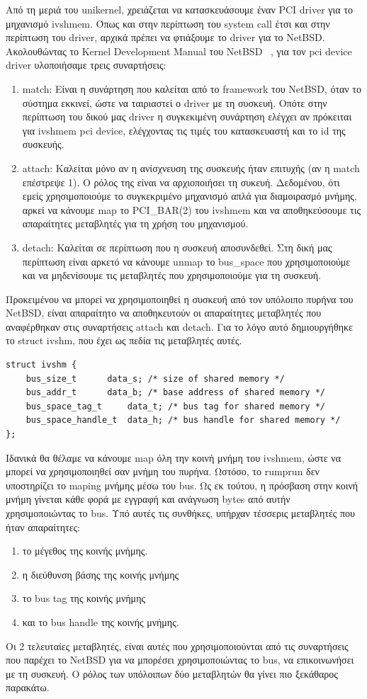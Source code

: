 Από τη μεριά του unikernel, χρειάζεται να κατασκευάσουμε έναν PCI driver για το
μηχανισμό ivshmem. Όπως και στην περίπτωση του system call έτσι και στην
περίπτωση του driver, αρχικά πρέπει να φτιάξουμε το driver για το NetBSD. 
Ακολουθώντας το Kernel Development Manual του NetBSD ~\cite{NetBSDKDMDriver},
για τον pci device driver υλοποιήσαμε τρεις συναρτήσεις:
\begin{enumerate}
	\item match: Είναι η συνάρτηση που καλείται από το 
		framework του NetBSD, όταν το σύστημα εκκινεί, ώστε να
		ταιριαστεί ο driver με τη συσκευή. Οπότε στην περίπτωση του
		δικού μας driver η συγκεκιμένη συνάρτηση ελέγχει αν πρόκειται
		για ivshmem pci device, ελέγχοντας τις τιμές του κατασκευαστή
		και το id της συσκευής.
	\item attach: Καλείται μόνο αν η ανίσχνευση της συσκευής ήταν επιτυχής
		(αν η match επέστρεψε 1). Ο ρόλος της είναι να αρχιοποιήσει τη
		συκευή. Δεδομένου, ότι εμείς χρησιμοποιούμε το συγκεκριμένο
		μηχανισμό απλά για διαμοιρασμό μνήμης, αρκεί να κάνουμε map το
		PCI\_BAR(2) του ivshmem και να αποθηκεύσουμε τις απαραίτητες
		μεταβλητές για τη χρήση του μηχανισμού.
	\item detach: Καλείται σε περίπτωση που η συσκευή αποσυνδεθεί. Στη δική
		μας περίπτωση είναι αρκετό να κάνουμε unmap το bus\_space που
		χρησιμοποιούμε και να μηδενίσουμε τις μεταβλητές που
		χρησιμοποιούμε για τη συσκευή.
\end{enumerate}

Προκειμένου να μπορεί να χρησιμοποιηθεί η συσκευή από τον υπόλοιπο πυρήνα του
NetBSD, είναι απαραίτητο να αποθηκευτούν οι απαραίτητες μεταβλητές που
αναφέρθηκαν στις συναρτήσεις attach και detach. Για το λόγο αυτό δημιουργήθηκε
το struct ivshm, που έχει ως πεδία τις μεταβλητές αυτές. 
\newpage
\begin{lstlisting}[numbers=none]
struct ivshm {
	bus_size_t		data_s;	/* size of shared memory */
	bus_addr_t		data_b;	/* base address of shared memory */
	bus_space_tag_t		data_t;	/* bus tag for shared memory */
	bus_space_handle_t	data_h;	/* bus handle for shared memory */
};
\end{lstlisting}
Ιδανικά θα θέλαμε να κάνουμε map όλη την κοινή μνήμη του ivshmem, ώστε να μπορεί
να χρησιμοποιηθεί σαν μνήμη του πυρήνα. Ωστόσο, το rumprun δεν υποστηρίζει το
maping μνήμης μέσω του bus. Ως εκ τούτου, η πρόσβαση στην κοινή μνήμη γίνεται
κάθε φορά με εγγραφή και ανάγνωση bytes από αυτήν χρησιμοποιώντας το bus. Υπό
αυτές τις συνθήκες, υπήρχαν τέσσερις μεταβλητές που ήταν απαραίτητες:
\begin{enumerate}
	\item το μέγεθος της κοινής μνήμης.
	\item η διεύθυνση βάσης της κοινής μνήμης
	\item το bus tag της κοινής μνήμης
	\item και το bus handle της κοινής μνήμης.
\end{enumerate}
Οι 2 τελευταίες μεταβλητές, είναι αυτές που χρησιμοποιούνται από τις συναρτήσεις
που παρέχει το NetBSD για να μπορέσει χρησιμοποιώντας το bus, να επικοινωνήσει
με τη συσκευή. Ο ρόλος των υπόλοιπων δύο μεταβλητών θα γίνει πιο ξεκάθαρος
παρακάτω.

